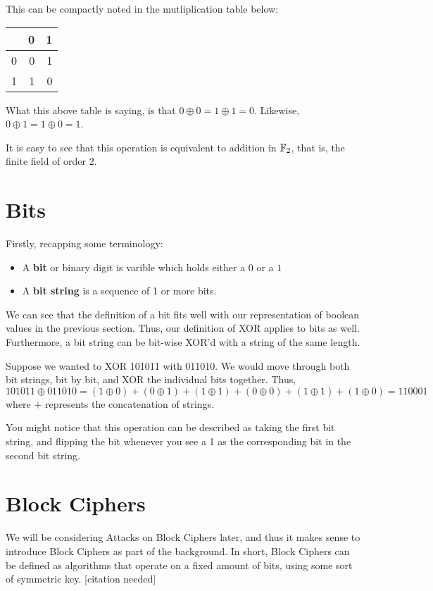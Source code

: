 This can be compactly noted in the mutliplication table below:
\begin{center}
\begin{tabular}{|r|r|r|}
\hline
& 0 & 1 \\\hline
0 & 0 & 1 \\\hline
1 & 1 & 0 \\\hline
\end{tabular}
\end{center}

What this above table is saying, is that $0 \oplus 0 = 1 \oplus 1 = 0$.
Likewise, $0 \oplus 1 = 1 \oplus 0 = 1$.

\begin{rem}
It is easy to see that this operation is equivalent to addition in ${\mathbb F}_2$,
that is, the finite field of order 2.
\end{rem}

\section{Bits}

Firstly, recapping some terminology:
\begin{itemize}
\item A \textbf{bit} or binary digit is varible which holds either a $0$ or a $1$
\item A \textbf{bit string} is a sequence of 1 or more bits.
\end{itemize}

We can see that the definition of a bit fits well with our representation of
boolean values in the previous section. Thus, our definition of XOR applies
to bits as well. Furthermore, a bit string can be bit-wise XOR'd with a string
of the same length. 

\begin{example}
Suppose we wanted to XOR 101011 with 011010. We would move through both bit
strings, bit by bit, and XOR the individual bits together.
Thus, $101011 \oplus 011010 = (1 \oplus 0) + (0 \oplus 1) + (1 \oplus 1) + (0 \oplus 0) + (1 \oplus 1) + (1 \oplus 0)
                            = 110001$
where $+$ represents the concatenation of strings.
\end{example}

You might notice that this operation can be described as taking the first bit
string, and flipping the bit whenever you see a 1 as the corresponding bit in
the second bit string.

\section{Block Ciphers}
We will be considering Attacks on Block Ciphers later, and thus it makes sense
to introduce Block Ciphers as part of the background.  In short, Block Ciphers
can be defined as algorithms that operate on a fixed amount of bits, using some
sort of symmetric key. [citation needed] 

